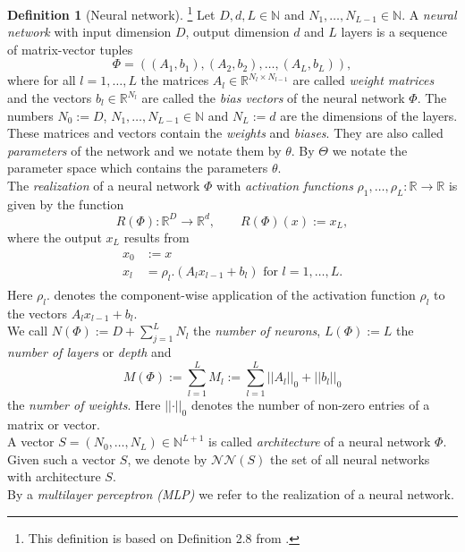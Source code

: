 \documentclass[11pt,titlepage]{article}
\newcommand{\R}{\mathbb{R}} %
\newcommand{\N}{\mathbb{N}} %
\newcommand{\abs}[1]{{\left| #1 \right|}}
\theoremstyle{definition}
\newtheorem{definition}[theorem]{Definition}
\theoremstyle{remark}
\begin{document}
	\newpage
	\begin{definition}[Neural network]\footnote{This definition is based on Definition 2.8 from \cite{Petersen2022}.}
		Let $D, d, L\in\N$ and $N_1,\ldots,N_{L-1}\in\N$. A \textsl{neural network} with input dimension $D$, output dimension $d$ and $L$ layers is a sequence of matrix-vector tuples
		\[\Phi = ((A_1,b_1),(A_2,b_2),\ldots,(A_L,b_L)),\]
		where for all $l=1,\ldots, L$ the matrices $A_l\in\R^{N_{l}\times N_{l-1}}$ are called \textsl{weight matrices} and the vectors $b_l\in \R^{N_l}$ are called the \textsl{bias vectors} of the neural network $\Phi$. The numbers $N_0:= D$, $N_1,\ldots,N_{L-1}\in\N$ and $N_L:= d$ are the dimensions of the layers. These matrices and vectors contain the \textsl{weights} and \textsl{biases}. They are also called \textsl{parameters} of the network and we notate them by $\theta$. By $\Theta$ we notate the parameter space which contains the parameters $\theta$.\\
		The \textsl{realization} of a neural network $\Phi$ with \textsl{activation functions} 
		$\rho_1,\ldots,\rho_{L}:\R\to\R$ is given by the function
		\[R(\Phi):\R^D\to\R^d,\qquad R(\Phi)(x):=x_L,\]
		where the output $x_L$ results from
		\begin{align}
			\begin{split}
				x_0&:=x \\
				x_l &= \rho_l .(A_l x_{l-1} + b_l) \text{ for } l = 1,\ldots, L. \label{Def. realization neural network}
			\end{split}
		\end{align}
		Here $\rho_l .$ denotes the component-wise application of the activation function $\rho_l$ to the vectors $A_l x_{l-1} + b_l$.\\
		We call $N(\Phi):= D + \sum_{j=1}^L N_l$ the \textsl{number of neurons}, $L(\Phi):= L$ the 	\textsl{number of layers} or \textsl{depth} and 
		\[M(\Phi):= \sum_{l=1}^L M_l:=\sum_{l=1}^L \abs{\abs{A_l}}_0 + \abs{\abs{b_l}}_0\]
		the \textsl{number of weights}. Here $\abs{\abs{\cdot}}_0$ denotes the number of non-zero entries of a matrix or vector. \\
		A vector $S=(N_0,\ldots,N_L)\in\N^{L+1}$ is called \textsl{architecture} of a neural network $\Phi$.
		Given such a vector $S$, we denote by $\mathcal{N}\mathcal{N}(S)$ the set of all neural networks with architecture $S$.\\
		By a \textsl{multilayer perceptron (MLP)} we refer to the realization of a neural network.
	\end{definition}	
	
\end{document}
